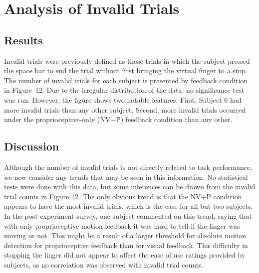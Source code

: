 \section{Analysis of Invalid Trials}
\label{invalid}



\subsection{Results}

Invalid trials were previously defined as those trials in which the
subject pressed the space bar to end the trial without first bringing
the virtual finger to a stop. The number of invalid trials for each
subject is presented by feedback condition in Figure~12. Due to the
irregular distribution of the data, no significance test was run.
However, the figure shows two notable features. First, Subject 6 had
more invalid trials than any other subject. Second, more invalid
trials occurred under the proprioceptive-only (NV$+$P) feedback
condition than any other.



\subsection{Discussion}

Although the number of invalid trials is not directly related to task
performance, we now consider any trends that may be seen in this
information. No statistical tests were done with this data, but some
inferences can be drawn from the invalid trial counts in Figure 12.
The only obvious trend is that the NV$+$P condition appears to have
the most invalid trials, which is the case for all but two subjects.
In the post-experiment survey, one subject commented on this trend,
saying that with only proprioceptive motion feedback it was hard to
tell if the finger was moving or not. This might be a result of a
larger threshold for absolute motion detection for proprioceptive
feedback than for visual feedback. This difficulty in stopping the
finger did not appear to affect the ease of use ratings provided by
subjects, as no correlation was observed with invalid trial counts.

